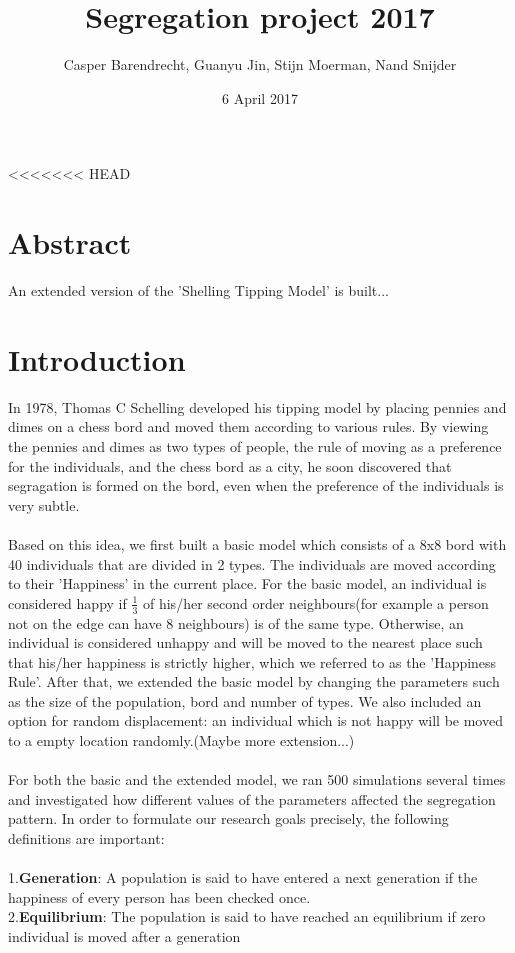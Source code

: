 \documentclass{article}
\title{Segregation project 2017}
\author{Casper Barendrecht, Guanyu Jin, Stijn Moerman, Nand Snijder}
\date{6 April 2017}
\begin{document}
\reversemarginpar 
\maketitle
<<<<<<< HEAD
\section{Abstract}
An extended version of the 'Shelling Tipping Model' is built...
\section{Introduction}
In 1978, Thomas C Schelling developed his tipping model by placing pennies and dimes on a chess bord and moved them according to various rules. By viewing the pennies and dimes as two types of people, the rule of moving as a preference for the individuals, and the chess bord as a city, he soon discovered that segragation is formed on the bord, even when the preference of the individuals is very subtle.\\
\\
Based on this idea, we first built a basic model which consists of a 8x8 bord with 40 individuals that are divided in 2 types. The individuals are moved according to their 'Happiness' in the current place. For the basic model, an individual is considered happy if $\frac{1}{3}$ of his/her second order neighbours(for example a person not on the edge can have 8 neighbours) is of the same type. Otherwise, an individual is considered unhappy and will be moved to the nearest place such that his/her happiness is strictly higher, which we referred to as the 'Happiness Rule'. After that, we extended the basic model by changing the parameters such as the size of the population, bord and number of types. We also included an option for random displacement: an individual which is not happy will be moved to a empty location randomly.(Maybe more extension...)\\\\
For both the basic and the extended model, we ran 500 simulations several times and investigated how different values of the parameters affected the segregation pattern. In order to formulate our research goals precisely, the following definitions are important:\\
\\
1.\textbf{Generation}: A population is said to have entered a next generation if the happiness of every person has been checked once. \\
2.\textbf{Equilibrium}: The population is said to have reached an equilibrium if zero individual is moved after a generation\\
\end{document}
